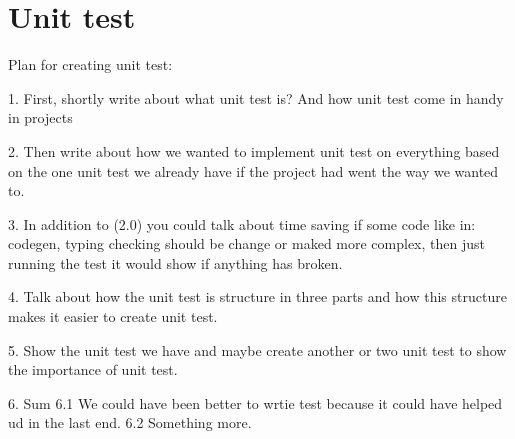\section{Unit test}\label{subsec:unittest}

Plan for creating unit test:

1. First, shortly write about what unit test is? And how unit test come in handy in projects

2. Then write about how we wanted to implement unit test on everything based on the one unit test we already have if the project had went the way we wanted to.

3. In addition to (2.0) you could talk about time saving if some code like in: codegen, typing checking should be change or maked more complex, then just running the test it would show if anything has broken.

4. Talk about how the unit test is structure in three parts and how this structure makes it easier to create unit test.

5. Show the unit test we have and maybe create another or two unit test to show the importance of unit test.

6. Sum
    6.1 We could have been better to wrtie test because it could have helped ud in the last end.
    6.2 Something more.